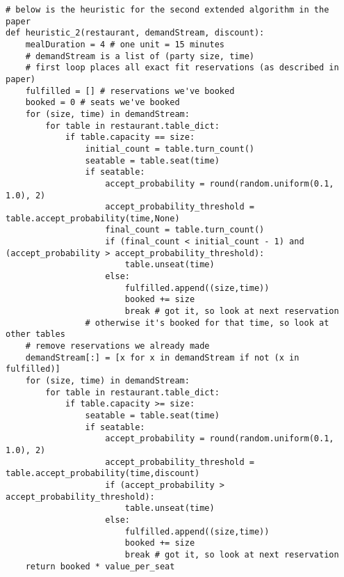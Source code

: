\documentclass[12pt, titlepage]{article}
\begin{document}
\begin{Verbatim}[fontsize=\scriptsize]
# below is the heuristic for the second extended algorithm in the paper
def heuristic_2(restaurant, demandStream, discount):
    mealDuration = 4 # one unit = 15 minutes
    # demandStream is a list of (party size, time)
    # first loop places all exact fit reservations (as described in paper)
    fulfilled = [] # reservations we've booked
    booked = 0 # seats we've booked
    for (size, time) in demandStream:
        for table in restaurant.table_dict:
            if table.capacity == size:
                initial_count = table.turn_count()
                seatable = table.seat(time)
                if seatable:
                    accept_probability = round(random.uniform(0.1, 1.0), 2)
                    accept_probability_threshold = table.accept_probability(time,None)
                    final_count = table.turn_count()
                    if (final_count < initial_count - 1) and (accept_probability > accept_probability_threshold):
                        table.unseat(time)
                    else:
                        fulfilled.append((size,time))
                        booked += size
                        break # got it, so look at next reservation
                # otherwise it's booked for that time, so look at other tables
    # remove reservations we already made
    demandStream[:] = [x for x in demandStream if not (x in fulfilled)]
    for (size, time) in demandStream:
        for table in restaurant.table_dict:
            if table.capacity >= size:
                seatable = table.seat(time)
                if seatable:
                    accept_probability = round(random.uniform(0.1, 1.0), 2)
                    accept_probability_threshold = table.accept_probability(time,discount)
                    if (accept_probability > accept_probability_threshold):
                        table.unseat(time)
                    else:
                        fulfilled.append((size,time))
                        booked += size
                        break # got it, so look at next reservation
    return booked * value_per_seat


\end{Verbatim}
\end{document}
